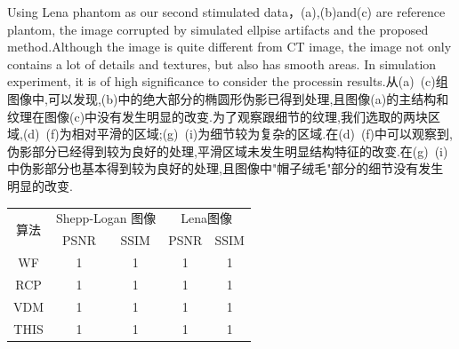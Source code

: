 \documentclass[hyperref]{ctexart}
\begin{document}
{\begin{figure}[H]
{			}
		\end{figure}
	
		\begin{multicols}{2}
		Using Lena phantom as our second stimulated data，(a),(b)and(c) are reference plantom, the image corrupted by simulated ellpise artifacts and  the proposed method.Although the image is quite different from CT image, the image not only contains a lot of details and textures, but also has smooth areas. In simulation experiment, it is of high significance to consider the processin results.从(a)~(c)组图像中,可以发现,(b)中的绝大部分的椭圆形伪影已得到处理,且图像(a)的主结构和纹理在图像(c)中没有发生明显的改变.为了观察跟细节的纹理,我们选取的两块区域,(d)~(f)为相对平滑的区域;(g)~(i)为细节较为复杂的区域.在(d)~(f)中可以观察到,伪影部分已经得到较为良好的处理,平滑区域未发生明显结构特征的改变.在(g)~(i)中伪影部分也基本得到较为良好的处理,且图像中"帽子绒毛"部分的细节没有发生明显的改变.
		
		\begin{tabular}{ccccc}
				\hline
				\multirow{2}{*}{算法} & \multicolumn{2}{c}{Shepp-Logan 图像} & \multicolumn{2}{c}{Lena图像} \\
				& PSNR             & SSIM            & PSNR         & SSIM        \\ \hline
				WF                  & 1                & 1               & 1            & 1           \\
				RCP                 & 1                & 1               & 1            & 1           \\
				VDM                 & 1                & 1               & 1            & 1           \\
				THIS                & 1                & 1               & 1            & 1           \\ \hline
		\end{tabular}
		\end{multicols}
	
}
\end{document}

